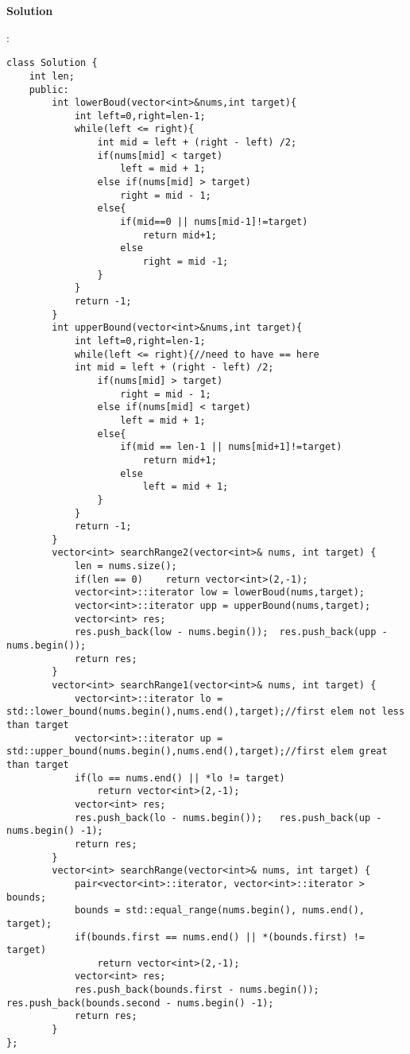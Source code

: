 \begin{description}
    \item{\textbf{Solution}}\\
	\item{} : \\
		\begin{lstlisting}
class Solution {
	int len;
	public:
		int lowerBoud(vector<int>&nums,int target){
			int left=0,right=len-1;
			while(left <= right){
				int mid = left + (right - left) /2;
				if(nums[mid] < target)
					left = mid + 1;
				else if(nums[mid] > target)
					right = mid - 1;
				else{
					if(mid==0 || nums[mid-1]!=target)
						return mid+1;
					else
						right = mid -1;
				}
			}
			return -1;
		}
		int upperBound(vector<int>&nums,int target){
			int left=0,right=len-1;
			while(left <= right){//need to have == here
			int mid = left + (right - left) /2;
				if(nums[mid] > target)
					right = mid - 1;
				else if(nums[mid] < target)
					left = mid + 1;
				else{
					if(mid == len-1 || nums[mid+1]!=target)
						return mid+1;
					else
						left = mid + 1;
				}
			}
			return -1;
		}
		vector<int> searchRange2(vector<int>& nums, int target) {
			len = nums.size();
			if(len == 0)	return vector<int>(2,-1);
			vector<int>::iterator low = lowerBoud(nums,target);
			vector<int>::iterator upp = upperBound(nums,target);
			vector<int> res;
			res.push_back(low - nums.begin());	res.push_back(upp - nums.begin());
			return res;
		}
		vector<int> searchRange1(vector<int>& nums, int target) {
			vector<int>::iterator lo = std::lower_bound(nums.begin(),nums.end(),target);//first elem not less than target
			vector<int>::iterator up = std::upper_bound(nums.begin(),nums.end(),target);//first elem great than target
			if(lo == nums.end() || *lo != target)
				return vector<int>(2,-1);
			vector<int> res;
			res.push_back(lo - nums.begin());	res.push_back(up - nums.begin() -1);
			return res;
		}
		vector<int> searchRange(vector<int>& nums, int target) {
			pair<vector<int>::iterator, vector<int>::iterator > bounds;
			bounds = std::equal_range(nums.begin(), nums.end(), target);
			if(bounds.first == nums.end() || *(bounds.first) != target)
				return vector<int>(2,-1);
			vector<int> res;
			res.push_back(bounds.first - nums.begin());	res.push_back(bounds.second - nums.begin() -1);
			return res;
		}
};
		\end{lstlisting}

\end{description}

